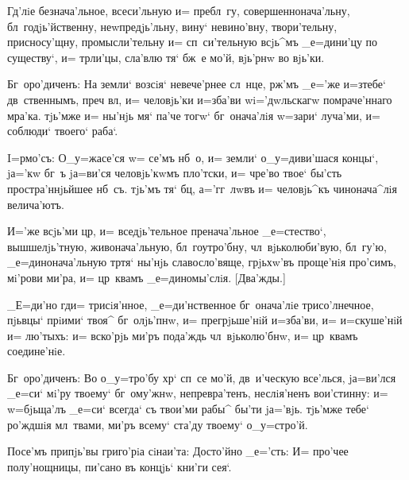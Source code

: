 Гд'лiе безнача'льное, всеси'льную и= пребл~гу, 
совершеннонача'льну, бл~годjь'йственну, неwпредjь'льну, 
вину` невино'вну, твори'тельну, присносу'щну, 
промысли'тельну и= сп~си'тельную всjь^мъ _е=дини'цу по 
существу`, и= тр ли'цы, сла'влю тя` бж~е мо'й, 
вjь'рнw во вjь'ки.

Бг~оро'диченъ: На земли` возсiя` невече'рнее сл~нце, 
рж'мъ _е='же и=з\ъ тебе` дв~ственнымъ, преч 
вл, и= человjь'ки и=зба'ви w\т i='дwльскагw 
помраче'ннаго мра'ка. тjь'мже и= ны'нjь мя` па'че тогw` 
бг~онача'лiя w=зари` луча'ми, и= соблюди` твоего` раба`.


I=рмо'съ: О_у=жасе'ся w= се'мъ нб~о, и= земли` 
о_у=диви'шася концы`, jа='кw бг~ъ jа=ви'ся человjь'кwмъ 
пло'тски, и= чре'во твое` бы'сть простра'ннjьйшее нб~съ. 
тjь'мъ тя` бц, а='гг~лwвъ и= человjь^къ чинонача^лiя 
велича'ютъ.

И='же всjь'ми цр, и= вседjь'тельное 
пренача'льное _е=стество`, вышшелjь'тную, живонача'льную, 
бл~гоутро'бну, чл~вjьколюби'вую, бл~гу'ю, 
_е=динонача'льную тр тя` ны'нjь славосло'вяще, 
грjьхw'въ проще'нiя про'симъ, мi'рови ми'ра, и= цр~квамъ 
_е=диномы'слiя. [Два'жды.]

_Е=ди'но гд и= трисiя'нное, _е=ди'нственное 
бг~онача'лiе трисо'лнечное, пjьвцы` прiими` твоя^ 
бг~олjь'пнw, и= прегрjьше'нiй и=зба'ви, и= и=скуше'нiй и= 
лю'тыхъ: и= вско'рjь ми'ръ пода'ждь чл~вjьколю'бнw, и= 
цр~квамъ соедине'нiе.

Бг~оро'диченъ: Во о_у=тро'бу хр` сп~се мо'й, 
дв~и'ческую все'лься, jа=ви'лся _е=си` мi'ру твоему` 
бг~ому'жнw, непревра'тенъ, неслiя'ненъ вои'стинну: и= 
w=бjьща'лъ _е=си` всегда` съ твои'ми рабы^ бы'ти jа='вjь. 
тjь'мже тебе` ро'ждшiя мл~твами, ми'ръ всему` ста'ду 
твоему` о_у=стро'й.

Посе'мъ припjь'вы григо'рiа сiнаи'та: Досто'йно 
_е='сть: И= про'чее полу'нощницы, пи'сано въ концjь` 
кни'ги сея`.